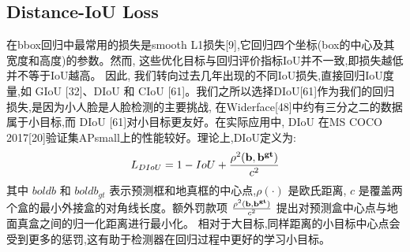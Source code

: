 \documentclass[twocolumn,10pt,a4paper]{article}%
\begin{document}
	\subsection{Distance-IoU Loss}
	在bbox回归中最常用的损失是smooth L1损失[9],它回归四个坐标(box的中心及其宽度和高度)的参数。然而, 这些优化目标与回归评价指标IoU并不一致,即损失越低并不等于IoU越高。
	因此, 我们转向过去几年出现的不同IoU损失,直接回归IoU度量,如 GIoU [32]、DIoU 和 CIoU [61]。我们之所以选择DIoU[61]作为我们的回归损失,是因为小人脸是人脸检测的主要挑战,
	在Widerface[48]中约有三分之二的数据属于小目标,而 DIoU [61]对小目标更友好。在实际应用中, DIoU 在MS COCO 2017[20]验证集APsmall上的性能较好。理论上,DIoU定义为:
	\begin{equation}
		L_{DIoU}=1-IoU+\frac{\rho^{2}(\bold{b},\bold{b^{gt}})}{c^{2}}
	\end{equation}
	其中 $bold{b}$ 和 $bold{b_{gt}}$ 表示预测框和地真框的中心点,$\rho(·)$ 是欧氏距离, $c$ 是覆盖两个盒的最小外接盒的对角线长度。额外罚款项
	$\frac{\rho^{2}(\bold{b},\bold{b^{gt}})}{c^{2}}$ 提出对预测盒中心点与地面真盒之间的归一化距离进行最小化。
	相对于大目标,同样距离的小目标中心点会受到更多的惩罚,这有助于检测器在回归过程中更好的学习小目标。



\end{document}
